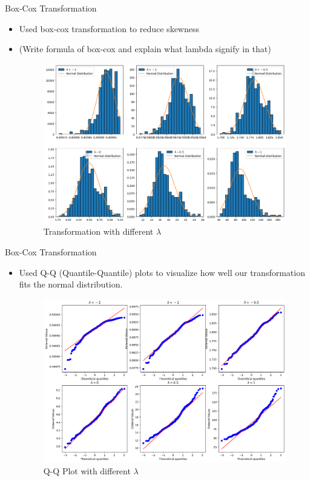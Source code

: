 \begin{frame}{Box-Cox Transformation}
\begin{itemize}
    \item Used box-cox transformation to reduce skewness
    \item (Write formula of box-cox and explain what lambda signify in that)
    \begin{figure}
        \centering
        \includegraphics[width=0.8\linewidth]{Project1/Report/images/transforms.png}
        \caption{Transformation with different $\lambda$}
        \label{fig:enter-label}
    \end{figure}
\end{itemize}
  
\end{frame}
\begin{frame}{Box-Cox Transformation}
\begin{itemize}
    \item Used Q-Q (Quantile-Quantile) plots to visualize how well our transformation fits the normal distribution.
    \vspace{0.25in}
    \begin{figure}
        \centering
        \includegraphics[width=0.8\linewidth]{Project1/Report/images/q-q.png}
        \caption{Q-Q Plot with different $\lambda$}
        \label{fig:enter-label}
    \end{figure}
\end{itemize}

\end{frame}

